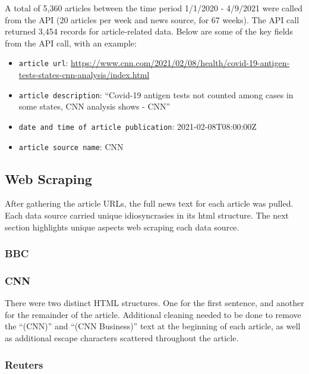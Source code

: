 \documentclass[
]{article}
\begin{document}
A total of 5,360 articles between the time period 1/1/2020 - 4/9/2021
were called from the API (20 articles per week and news source, for 67
weeks). The API call returned 3,454 records for article-related data.
Below are some of the key fields from the API call, with an example:

\begin{itemize}
\item
  \texttt{article\ url}:
  \url{https://www.cnn.com/2021/02/08/health/covid-19-antigen-tests-states-cnn-analysis/index.html}
\item
  \texttt{article\ description}: ``Covid-19 antigen tests not counted
  among cases in some states, CNN analysis shows - CNN''
\item
  \texttt{date\ and\ time\ of\ article\ publication}:
  2021-02-08T08:00:00Z
\item
  \texttt{article\ source\ name}: CNN
\end{itemize}

\hypertarget{web-scraping}{%
\subsection{Web Scraping}\label{web-scraping}}

After gathering the article URLs, the full news text for each article
was pulled. Each data source carried unique idiosyncrasies in its html
structure. The next section highlights unique aspects web scraping each
data source.

\hypertarget{bbc}{%
\subsubsection{BBC}\label{bbc}}

\hypertarget{cnn}{%
\subsubsection{CNN}\label{cnn}}

There were two distinct HTML structures. One for the first sentence, and
another for the remainder of the article. Additional cleaning needed to
be done to remove the ``(CNN)'' and ``(CNN Business)'' text at the
beginning of each article, as well as additional escape characters
scattered throughout the article.

\hypertarget{reuters}{%
\subsubsection{Reuters}\label{reuters}}
\end{document}
